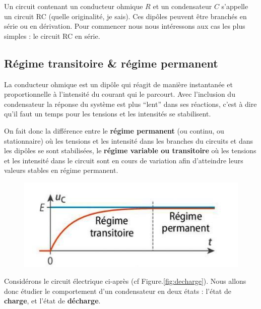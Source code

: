 \documentclass[11pt,a4paper]{article}
\begin{document}
Un circuit contenant un conducteur ohmique $R$ et un condensateur $C$ s'appelle un circuit RC (quelle originalité, je sais). Ces dipôles peuvent être branchés en série ou en dérivation. Pour commencer nous nous intéressons aux cas les plus simples : le circuit RC en série. 

\subsection{Régime transitoire \& régime permanent}
La conducteur ohmique est un dipôle qui réagit de manière instantanée et proportionnelle à l'intensité du courant qui le parcourt. Avec l'inclusion du condensateur la réponse du système est plus ``lent'' dans ses réactions, c'est à dire qu'il faut un temps pour les tensions et les intensités se stabilisent. 

On fait donc la différence entre le \textbf{régime permanent} (ou continu, ou stationnaire) où les tensions et les intensité dans les branches du circuits et dans les dipôles se sont stabilisées, le \textbf{régime variable ou transitoire}  où les tensions et les intensité dans le circuit sont en cours de variation afin d'atteindre leurs valeurs stables en régime permanent. 

\begin{figure}[H]
    \centering
    \includegraphics[width=0.8\linewidth]{imgs/p7/regimes.jpg}
\end{figure}

Considérons le circuit électrique ci-après (cf Figure.\ref{fig:decharge}). Nous allons donc étudier le comportement d'un condensateur en deux états : l'état de \textbf{charge}, et l'état de \textbf{décharge}. 
\end{document}
